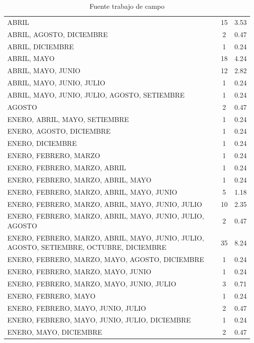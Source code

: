 \documentclass{article}\usepackage[]{graphicx}\usepackage[table]{xcolor}
\newenvironment{tablas}[2]
{\begin{table}[H]
		\centering
		\caption{#1}
		#2
		\caption*{Fuente trabajo de campo}}
	{\end{table}}
\begin{document}
\begin{tablas}
{Meses en los que realiza la cosecha}{

\begin{tabular}{lcl}
\toprule
\cellcolor[HTML]{87A96B}{\textcolor{black}{\textbf{Meses}}} & \cellcolor[HTML]{87A96B}{\textcolor{black}{\textbf{Conteo}}} & \cellcolor[HTML]{87A96B}{\textcolor{black}{\textbf{Porcentaje}}}\\
\midrule
ABRIL & 15 & 3.53\\
ABRIL, AGOSTO, DICIEMBRE & 2 & 0.47\\
ABRIL, DICIEMBRE & 1 & 0.24\\
ABRIL, MAYO & 18 & 4.24\\
ABRIL, MAYO, JUNIO & 12 & 2.82\\
\addlinespace
ABRIL, MAYO, JUNIO, JULIO & 1 & 0.24\\
ABRIL, MAYO, JUNIO, JULIO, AGOSTO, SETIEMBRE & 1 & 0.24\\
AGOSTO & 2 & 0.47\\
ENERO, ABRIL, MAYO, SETIEMBRE & 1 & 0.24\\
ENERO, AGOSTO, DICIEMBRE & 1 & 0.24\\
\addlinespace
ENERO, DICIEMBRE & 1 & 0.24\\
ENERO, FEBRERO, MARZO & 1 & 0.24\\
ENERO, FEBRERO, MARZO, ABRIL & 1 & 0.24\\
ENERO, FEBRERO, MARZO, ABRIL, MAYO & 1 & 0.24\\
ENERO, FEBRERO, MARZO, ABRIL, MAYO, JUNIO & 5 & 1.18\\
\addlinespace
ENERO, FEBRERO, MARZO, ABRIL, MAYO, JUNIO, JULIO & 10 & 2.35\\
ENERO, FEBRERO, MARZO, ABRIL, MAYO, JUNIO, JULIO, AGOSTO & 2 & 0.47\\
ENERO, FEBRERO, MARZO, ABRIL, MAYO, JUNIO, JULIO, AGOSTO, SETIEMBRE, OCTUBRE, DICIEMBRE & 35 & 8.24\\
ENERO, FEBRERO, MARZO, MAYO, AGOSTO, DICIEMBRE & 1 & 0.24\\
ENERO, FEBRERO, MARZO, MAYO, JUNIO & 1 & 0.24\\
\addlinespace
ENERO, FEBRERO, MARZO, MAYO, JUNIO, JULIO & 3 & 0.71\\
ENERO, FEBRERO, MAYO & 1 & 0.24\\
ENERO, FEBRERO, MAYO, JUNIO, JULIO & 2 & 0.47\\
ENERO, FEBRERO, MAYO, JUNIO, JULIO, DICIEMBRE & 1 & 0.24\\
ENERO, MAYO, DICIEMBRE & 2 & 0.47\\

\end{tabular}}
\end{tablas}
\end{document}
